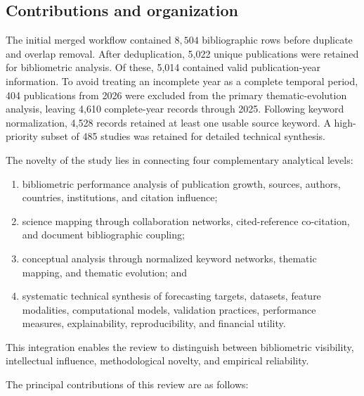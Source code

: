 \documentclass[pdflatex,sn-mathphys-num]{sn-jnl}%
\theoremstyle{thmstyleone}%
\theoremstyle{thmstyletwo}%
\theoremstyle{thmstylethree}%
\begin{document}
\subsection{Contributions and organization}
\label{subsec:review_contribution}

The initial merged workflow contained \(8{,}504\) bibliographic
rows before duplicate and overlap removal. After deduplication,
5,022 unique publications were retained for bibliometric analysis. Of these,
5,014 contained valid publication-year information. To avoid treating an
incomplete year as a complete temporal period, 404 publications from 2026
were excluded from the primary thematic-evolution analysis, leaving 4,610
complete-year records through 2025. Following keyword normalization, 4,528
records retained at least one usable source keyword. A high-priority subset
of 485 studies was retained for detailed technical synthesis.

The novelty of the study lies in connecting four complementary analytical
levels:

\begin{enumerate}
    \item bibliometric performance analysis of publication growth, sources,
    authors, countries, institutions, and citation influence;

    \item science mapping through collaboration networks, cited-reference
    co-citation, and document bibliographic coupling;

    \item conceptual analysis through normalized keyword networks, thematic
    mapping, and thematic evolution; and

    \item systematic technical synthesis of forecasting targets, datasets,
    feature modalities, computational models, validation practices,
    performance measures, explainability, reproducibility, and financial
    utility.
\end{enumerate}

This integration enables the review to distinguish between bibliometric
visibility, intellectual influence, methodological novelty, and empirical
reliability.

The principal contributions of this review are as follows:
\end{document}
